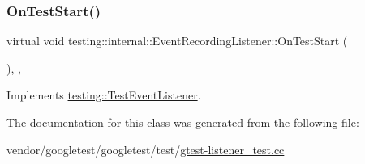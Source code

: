 \subsubsection{\texorpdfstring{On\+Test\+Start()}{OnTestStart()}}
{\footnotesize\ttfamily virtual void testing\+::internal\+::\+Event\+Recording\+Listener\+::\+On\+Test\+Start (\begin{DoxyParamCaption}\item[{const \hyperlink{classtesting_1_1_test_info}{Test\+Info} \&}]{ }\end{DoxyParamCaption})\hspace{0.3cm}{\ttfamily [inline]}, {\ttfamily [protected]}, {\ttfamily [virtual]}}



Implements \hyperlink{classtesting_1_1_test_event_listener_ab4f6a0ca16ae75daf385b3b5914e1048}{testing\+::\+Test\+Event\+Listener}.



The documentation for this class was generated from the following file\+:\begin{DoxyCompactItemize}
\item 
vendor/googletest/googletest/test/\hyperlink{gtest-listener__test_8cc}{gtest-\/listener\+\_\+test.\+cc}\end{DoxyCompactItemize}
